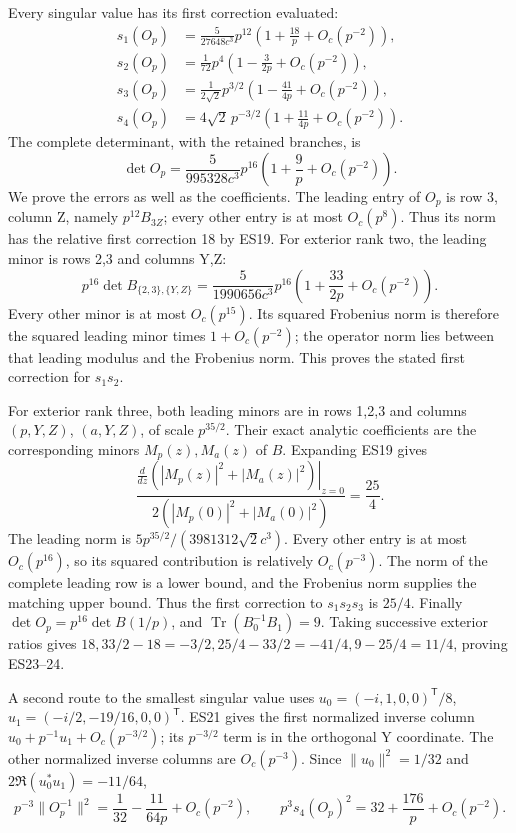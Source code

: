 \documentclass[11pt]{article}
\begin{document}
Every singular value has its first correction evaluated: \[
\boxed{\begin{aligned}
s_1(O_p)&=\frac5{27648c^3}p^{12}\left(1+\frac{18}{p}+O_c(p^{-2})\right),\\
s_2(O_p)&=\frac1{72}p^4\left(1-\frac{3}{2p}+O_c(p^{-2})\right),\\
s_3(O_p)&=\frac1{2\sqrt2}p^{3/2}\left(1-\frac{41}{4p}+O_c(p^{-2})\right),\\
s_4(O_p)&=4\sqrt2\,p^{-3/2}\left(1+\frac{11}{4p}+O_c(p^{-2})\right).
\end{aligned}}
\tag{ES23}
\] The complete determinant, with the retained branches, is \[
\boxed{\det O_p=\frac5{995328c^3}p^{16}\left(1+\frac9p+O_c(p^{-2})\right).}
\tag{ES24}
\] We prove the errors as well as the coefficients. The leading entry of \(O_p\) is row 3, column Z, namely \(p^{12}B_{3Z}\); every other entry is at most \(O_c(p^8)\). Thus its norm has the relative first correction 18 by ES19. For exterior rank two, the leading minor is rows 2,3 and columns Y,Z: \[
p^{16}\det B_{\{2,3\},\{Y,Z\}}
=\frac5{1990656c^3}p^{16}\left(1+\frac{33}{2p}+O_c(p^{-2})\right).
\] Every other minor is at most \(O_c(p^{15})\). Its squared Frobenius norm is therefore the squared leading minor times \(1+O_c(p^{-2})\); the operator norm lies between that leading modulus and the Frobenius norm. This proves the stated first correction for \(s_1s_2\).

For exterior rank three, both leading minors are in rows 1,2,3 and columns \((p,Y,Z)\), \((a,Y,Z)\), of scale \(p^{35/2}\). Their exact analytic coefficients are the corresponding minors \(M_p(z),M_a(z)\) of \(B\). Expanding ES19 gives \[
\frac{\left.\frac d{dz}(|M_p(z)|^2+|M_a(z)|^2)\right|_{z=0}}
{2(|M_p(0)|^2+|M_a(0)|^2)}=\frac{25}{4}.
\] The leading norm is \(5p^{35/2}/(3981312\sqrt2c^3)\). Every other entry is at most \(O_c(p^{16})\), so its squared contribution is relatively \(O_c(p^{-3})\). The norm of the complete leading row is a lower bound, and the Frobenius norm supplies the matching upper bound. Thus the first correction to \(s_1s_2s_3\) is \(25/4\). Finally \(\det O_p=p^{16}\det B(1/p)\), and \(\operatorname{Tr}(B_0^{-1}B_1)=9\). Taking successive exterior ratios gives \(18,33/2-18=-3/2,25/4-33/2=-41/4,9-25/4=11/4\), proving ES23--24.

A second route to the smallest singular value uses \(u_0=(-i,1,0,0)^{\mathsf T}/8\), \(u_1=(-i/2,-19/16,0,0)^{\mathsf T}\). ES21 gives the first normalized inverse column \(u_0+p^{-1}u_1+O_c(p^{-3/2})\); its \(p^{-3/2}\) term is in the orthogonal Y coordinate. The other normalized inverse columns are \(O_c(p^{-3})\). Since \(\|u_0\|^2=1/32\) and \(2\Re(u_0^*u_1)=-11/64\), \[
p^{-3}\|O_p^{-1}\|^2=\frac1{32}-\frac{11}{64p}+O_c(p^{-2}),\qquad
\boxed{p^3s_4(O_p)^2=32+\frac{176}{p}+O_c(p^{-2}).}
\tag{ES25}
\]
\end{document}
